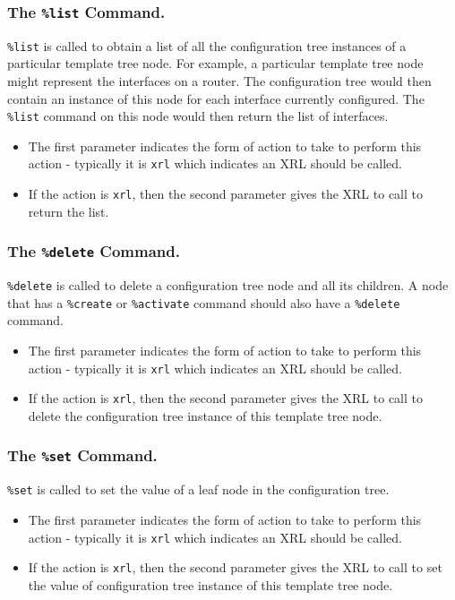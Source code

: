 \documentclass[11pt]{article}
\begin{document}
\subsubsection{The {\tt \%list} Command.}
{\tt \%list} is called to obtain a list of all the configuration tree
instances of a particular template tree node.  For example, a
particular template tree node might represent the interfaces on a
router.  The configuration tree would then contain an instance of this
node for each interface currently configured.  The {\tt \%list}
command on this node would then return the list of interfaces.
\begin{itemize}
\item The first parameter indicates the form of action to take to perform
this action - typically it is {\tt xrl} which indicates an XRL should
be called.
\item If the action is {\tt xrl}, then the second parameter gives the XRL to
call to return the list.
\end{itemize}

\subsubsection{The {\tt \%delete} Command.}
{\tt \%delete} is called to delete a configuration tree node and all its
children.  A node that has a {\tt \%create} or {\tt \%activate}
command should also have a {\tt \%delete} command.
\begin{itemize}
\item The first parameter indicates the form of action to take to perform
this action - typically it is {\tt xrl} which indicates an XRL should
be called.
\item If the action is {\tt xrl}, then the second parameter gives the XRL to
call to delete the configuration tree instance of this template tree
node.
\end{itemize}

\subsubsection{The {\tt \%set} Command.}
{\tt \%set} is called to set the value of a leaf node in the
configuration tree.
\begin{itemize}
\item The first parameter indicates the form of action to take to perform
this action - typically it is {\tt xrl} which indicates an XRL should
be called.
\item If the action is {\tt xrl}, then the second parameter gives the XRL to
call to set the value of configuration tree instance of this template
tree node.
\end{itemize}
\end{document}
